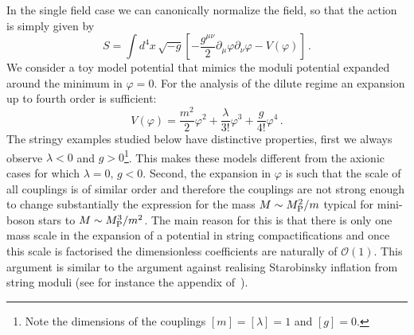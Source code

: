 \documentclass[11pt,a4paper]{article}
\begin{document}
In the single field case we can canonically normalize the field, so that the action is simply given by
\begin{equation}
\label{eq:ScalarAction}
S = \int d^4x\, \sqrt{-g} \left[- \frac{g^{\mu \nu}}{2} \partial_\mu \varphi \partial_\nu \varphi - V(\varphi)\right]\,.
\end{equation}
We consider a toy model potential that mimics the moduli potential expanded around the minimum in $\varphi = 0$. For the analysis of the dilute regime an expansion up to fourth order is sufficient:
\begin{equation}
\label{eq:ToyPotential}
V(\varphi) = \frac{m^2}{2} \varphi^2 + \frac{\lambda}{3!} \varphi^3 + \frac{g}{4!} \varphi^4 \,.
\end{equation}
The stringy examples studied below have distinctive properties, first we always observe $\lambda < 0$ and $g > 0$\footnote{Note the dimensions of the couplings $[m] = [\lambda] = 1$ and $[g]=0$.}. This makes these models different from the axionic cases for which $\lambda=0,\,  g<0$. Second, the expansion in $\varphi$ is such that the scale of all couplings is of similar order and therefore the couplings are not strong enough to change substantially the expression for the mass $M\sim M_{\rm P}^2/m$ typical for mini-boson stars to $M\sim M_{\rm P}^3/m^2$. The main reason for this is that there is only one mass scale in the expansion of a potential in string compactifications and once this scale is factorised the dimensionless coefficients are naturally of $\mathcal{O}(1)$. This argument is similar to the argument against realising Starobinsky inflation from string moduli (see for instance the appendix of~\cite{Burgess:2016owb}). \\
\end{document}
